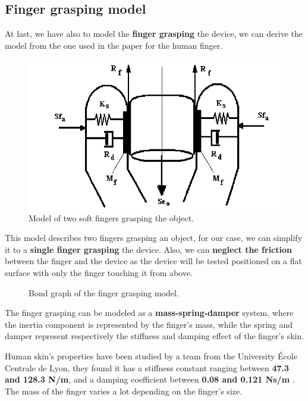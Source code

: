 \subsection{Finger grasping model}
\begin{samepage}
    At last, we have also to model the \textbf{finger grasping} the device, we can derive the model from the one used in the paper \cite{Finger_grasping_model} for the human finger.
    \nopagebreak

    \begin{figure}[H]
        \centering
        \includegraphics[width = 0.5\linewidth]{Chapters/Chapter2/Modelling_of_Entire_System/Figures/Model-of-two-soft-fingers-grasping-the-object.png}
        \caption{Model of two soft fingers grasping the object.}
        \label{fig: Finger_grasping_model}
    \end{figure}
\end{samepage}

This model describes two fingers grasping an object, for our case, we can simplify it to a \textbf{single finger grasping} the device.
Also, we can \textbf{neglect the friction} between the finger and the device as the device will be tested positioned on a flat surface with only the finger touching it from above.
\begin{figure}[H]
    \centering
    \resizebox{.7\linewidth}{!}{
        
    }
    \caption{Bond graph of the finger grasping model.}
    \label{fig: Finger_grasping_bond_graph}
\end{figure}

The finger grasping can be modeled as a \textbf{mass-spring-damper} system, where the inertia component is represented by the finger's mass, while the spring and damper represent respectively the stiffness and damping effect of the finger's skin.

Human skin's properties have been studied by a team from the University École Centrale de Lyon, they found it has a stiffness constant ranging between \textbf{47.3 and 128.3 N/m}, and a damping coefficient between \textbf{0.08 and 0.121 Ns/m} \cite{Mech_characteristics_of_human_skin}.
The mass of the finger varies a lot depending on the finger's size.
